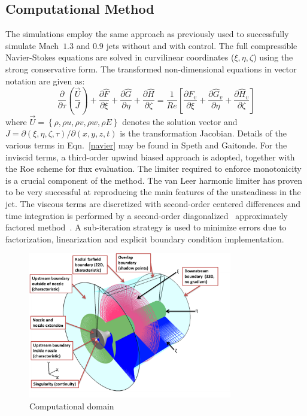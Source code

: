 \documentclass[english]{aiaa-tc}
\begin{document}
\subsection{Computational Method}\label{theo}
The simulations employ the same approach as previously used
to successfully simulate Mach~$1.3$ and $0.9$ jets without and with
control\cite{gdv2011-POF,SpethCF2013,speth2014}.  The full compressible
Navier-Stokes equations are solved in curvilinear coordinates
($\xi,\eta,\zeta$) using the
strong conservative form\cite{vm74-1,sjl78-1}. The transformed
non-dimensional equations in 
vector notation are given as: 
\begin{equation}
\frac{\partial}{\partial\tau}\left(\frac{\vec{U}}{J}\right)+\frac{\partial\hat{F}}{\partial\xi}+\frac{\partial\hat{G}}{\partial\eta}+\frac{\partial\hat{H}}{\partial\zeta}=\frac{1}{Re}\left[\frac{\partial\hat{F}_{v}}{\partial\xi}+\frac{\partial\hat{G}_{v}}{\partial\eta}+\frac{\partial\hat{H}_{v}}{\partial\zeta}\right]\label{navier}
\end{equation}
where $\vec{U}=\left\{ \rho,\rho u,\rho v,\rho w,\rho E\right\} $
denotes the solution vector and
$J=\partial\left(\xi,\eta,\zeta,\tau\right)/\partial\left(x,y,z,t\right)$
is the transformation Jacobian.  Details of the various terms in
Eqn.~\ref{navier} may be found in Speth and 
Gaitonde\cite{speth2012b}.
For the inviscid terms, a third-order upwind biased approach is
adopted, together with the Roe scheme\cite{rpl81-1} for flux evaluation.  The
limiter required to enforce monotonicity is a crucial 
component of the method.  The van Leer harmonic limiter\cite{lbv79-1}
has proven to be very successful at reproducing the main features of the
unsteadiness in the jet.  The viscous 
terms are discretized with second-order centered differences and time
integration is performed by a second-order diagonalized~\cite{pth81-1}
approximately 
factored method~\cite{br78-1}.  A sub-iteration
strategy is used to minimize errors due to factorization, linearization and
explicit boundary condition implementation.
\begin{figure}
\begin{center}
	\includegraphics[width=3.5in]{MACH09ComputationalDomain1.png}
\caption{Computational domain}\label{fig:M09Computationaldomain}
\end{center}
 \end{figure}
\end{document}
